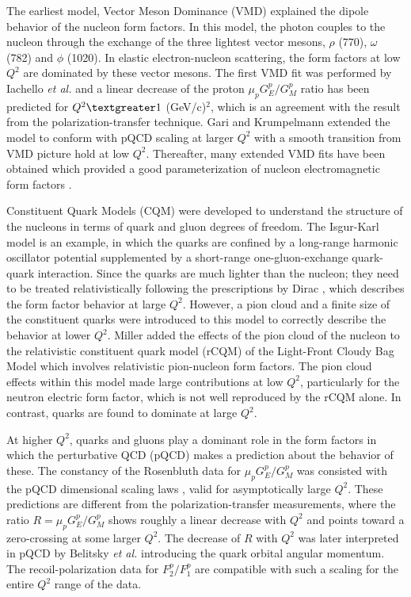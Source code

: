 \documentclass[12pt]{article}
\begin{document}
The earliest model, Vector Meson Dominance (VMD) explained the dipole behavior of the nucleon form factors. In this model, the photon couples to the nucleon through the exchange of the three lightest vector mesons, $\rho$ (770), $\omega$ (782) and $\phi$ (1020). In elastic electron-nucleon scattering, the form factors at low $Q^2$ are dominated by these vector mesons. The first VMD fit was performed by Iachello \emph{et al.} \cite{111} and a linear decrease of the proton $\mu_p G_E^p/G_M^p$ ratio has been predicted for $Q^2\textgreater1$ (GeV/c)$^2$, which is an agreement with the result from the polarization-transfer technique. Gari and Krumpelmann \cite{112} extended the model to conform with pQCD scaling at larger $Q^2$ with a smooth transition from VMD picture hold at low $Q^2$. Thereafter, many extended VMD fits have been obtained which provided a good parameterization of  nucleon electromagnetic form factors \cite{113, 114, 115, 116}.

Constituent Quark Models (CQM) were developed to understand the structure of the nucleons in terms of quark and gluon degrees of freedom. The Isgur-Karl model \cite{117} is an example, in which the quarks are confined by a long-range harmonic oscillator potential supplemented by a short-range one-gluon-exchange quark-quark interaction. Since the quarks are much lighter than the nucleon; they need to be treated relativistically following the prescriptions by Dirac \cite{118}, which describes the form factor behavior at large $Q^2$. However, a pion cloud and a finite size of the constituent quarks were introduced to this model to correctly describe the behavior at lower $Q^2$. Miller \cite{119} added the effects of the pion cloud of the nucleon to the relativistic constituent quark model (rCQM) of the Light-Front Cloudy Bag Model \cite{120} which involves relativistic pion-nucleon form factors. The pion cloud effects within this model made large contributions at low $Q^2$, particularly for the neutron electric form factor, which is not well reproduced by the rCQM alone. In contrast, quarks are found to dominate at large $Q^2$. 

At higher $Q^2$, quarks and gluons play a dominant role in the form factors in which the perturbative QCD (pQCD) makes a prediction about the behavior of these. The constancy of the Rosenbluth data for $\mu_p G_E^p/G_M^p$ was consisted with the pQCD dimensional scaling laws \cite{121}, valid for asymptotically large $Q^2$. These predictions are different from the polarization-transfer measurements, where the ratio $R=\mu_p G_E^p/G_M^p$ shows roughly a linear decrease with $Q^2$ and points toward a zero-crossing at some larger $Q^2$. The decrease of $R$ with $Q^2$ was later interpreted in pQCD by Belitsky \emph{et al.} \cite{122} introducing the quark orbital angular momentum. The recoil-polarization data for $F_2^p/F_1^p$ are compatible with such a scaling for the entire $Q^2$ range of the data.
\end{document}

